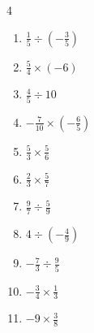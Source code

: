 \begin{multicols}{4}
\begin{enumerate}
\columnbreak %

\resetques

  \item $\displaystyle \frac{1}{5}\div{}\left(-\frac{3}{5}\right)$


  \item $\displaystyle \frac{5}{4}\times{}\left(-6\right)$


  \item $\displaystyle \frac{4}{5}\div{}10$


  \item $\displaystyle -\frac{7}{10}\times{}\left(-\frac{6}{5}\right)$


  \item $\displaystyle \frac{5}{3}\times{}\frac{5}{6}$


  \item $\displaystyle \frac{2}{3}\times{}\frac{5}{7}$


  \item $\displaystyle \frac{9}{7}\div{}\frac{5}{9}$


  \item $\displaystyle 4\div{}\left(-\frac{4}{9}\right)$

        \phantom{$\displaystyle =-9$}

  \item $\displaystyle -\frac{7}{3}\div{}\frac{9}{5}$


  \item $\displaystyle -\frac{3}{4}\times{}\frac{1}{3}$


\columnbreak %

  \item $\displaystyle -9\times{}\frac{3}{8}$



\end{enumerate}
\end{multicols}

